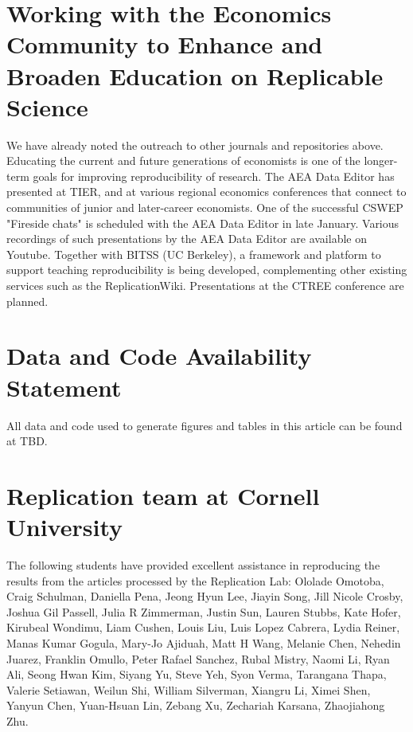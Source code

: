 \documentclass[PP]{AEA}
\begin{document}
\section{Working with the Economics Community to Enhance and Broaden Education on Replicable Science}

We have already noted the outreach to other journals and repositories above. Educating the current and future generations of economists is one of the longer-term goals for improving reproducibility of research. The AEA Data Editor has presented at TIER, and at various regional economics conferences that connect to communities of junior and later-career economists. One of the successful CSWEP "Fireside chats" is scheduled with the AEA Data Editor in late January. Various recordings of such presentations by the AEA Data Editor are available on Youtube. Together with BITSS (UC Berkeley), a framework and platform to support teaching reproducibility is being developed, complementing other existing services such as the ReplicationWiki. Presentations at the CTREE conference are planned. 

\section{Data and Code Availability Statement}
\label{sec:dcas}

All data and code used to generate figures and tables in this article can be found at TBD.

\FloatBarrier
%
%



\appendix

%

\section{Replication team at Cornell University}
\label{app:replicators}

The following students have provided excellent assistance in reproducing the results from the \jiramcs{} articles processed by the Replication Lab:
%
%
Ololade Omotoba,
Craig  Schulman,
Daniella Pena,
Jeong Hyun Lee,
Jiayin Song,
Jill Nicole Crosby,
Joshua Gil Passell,
Julia R Zimmerman,
Justin Sun,
Lauren  Stubbs,
Kate  Hofer,
Kirubeal  Wondimu,
Liam Cushen,
Louis Liu,
Luis  Lopez Cabrera,
Lydia Reiner,
Manas Kumar Gogula,
Mary-Jo  Ajiduah,
Matt H Wang,
Melanie Chen,
Nehedin  Juarez,
Franklin Omullo,
Peter Rafael Sanchez,
Rubal Mistry,
Naomi  Li,
Ryan Ali,
Seong Hwan Kim,
Siyang Yu,
Steve Yeh,
Syon Verma,
Tarangana Thapa,
Valerie  Setiawan,
Weilun Shi,
William  Silverman,
Xiangru Li,
Ximei Shen,
Yanyun Chen,
Yuan-Hsuan Lin,
Zebang Xu,
Zechariah  Karsana,
Zhaojiahong Zhu.
\end{document}
